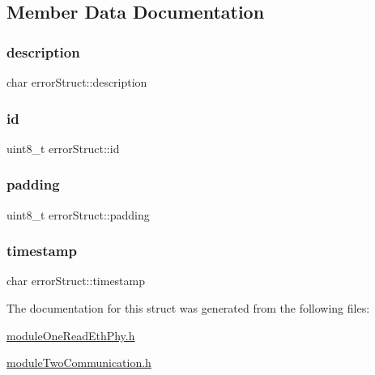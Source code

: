 \subsection{Member Data Documentation}
\mbox{\label{structerror_struct_aed437236613db32b2b56361e2cbf3ce6}} 
\subsubsection{\texorpdfstring{description}{description}}
{\footnotesize\ttfamily char error\+Struct\+::description}

\mbox{\label{structerror_struct_af07d527b0695dad43376f6658ca6d9d3}} 
\subsubsection{\texorpdfstring{id}{id}}
{\footnotesize\ttfamily uint8\+\_\+t error\+Struct\+::id}

\mbox{\label{structerror_struct_a14bf4c23e01145e362768dfdc4466737}} 
\subsubsection{\texorpdfstring{padding}{padding}}
{\footnotesize\ttfamily uint8\+\_\+t error\+Struct\+::padding}

\mbox{\label{structerror_struct_a51e5ae4be96680737622f257e2eb2479}} 
\subsubsection{\texorpdfstring{timestamp}{timestamp}}
{\footnotesize\ttfamily char error\+Struct\+::timestamp}



The documentation for this struct was generated from the following files\+:\begin{DoxyCompactItemize}
\item 
\mbox{\hyperlink{module_one_read_eth_phy_8h}{module\+One\+Read\+Eth\+Phy.\+h}}\item 
\mbox{\hyperlink{module_two_communication_8h}{module\+Two\+Communication.\+h}}\end{DoxyCompactItemize}
